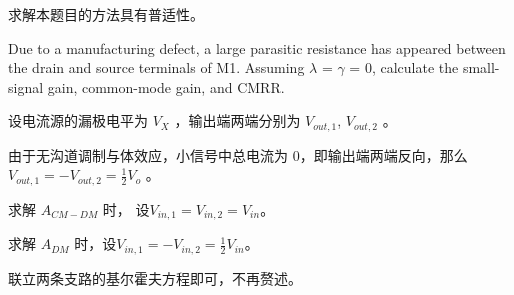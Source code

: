 \documentclass[cn,11pt,chinese,black,simple]{../elegantbook}
\begin{document}
求解本题目的方法具有普适性。

\begin{exercise}
    Due to a manufacturing defect, a large parasitic resistance has appeared between the drain and source terminals of M1. Assuming \(\lambda\) = \(\gamma\) = 0, calculate the small-signal gain, common-mode gain, and CMRR. 
\end{exercise}

\begin{solution}
    设电流源的漏极电平为 \(V_X\) ，输出端两端分别为 \(V_{out,1}\), \(V_{out,2}\) 。

    由于无沟道调制与体效应，小信号中总电流为 \(0\)，即输出端两端反向，那么 \(V_{out,1} = - V_{out,2} = \displaystyle\frac{1}{2} V_o\) 。

    求解 \(A_{CM-DM}\) 时， 设\(V_{in,1} = V_{in,2} = V_{in}\)。

    求解 \(A_{DM}\) 时，设\(V_{in,1} = - V_{in,2} = \displaystyle \frac{1}{2} V_{in}\)。

    联立两条支路的基尔霍夫方程即可，不再赘述。
\end{solution}





\ifx\mainclass\undefined
\end{document}
